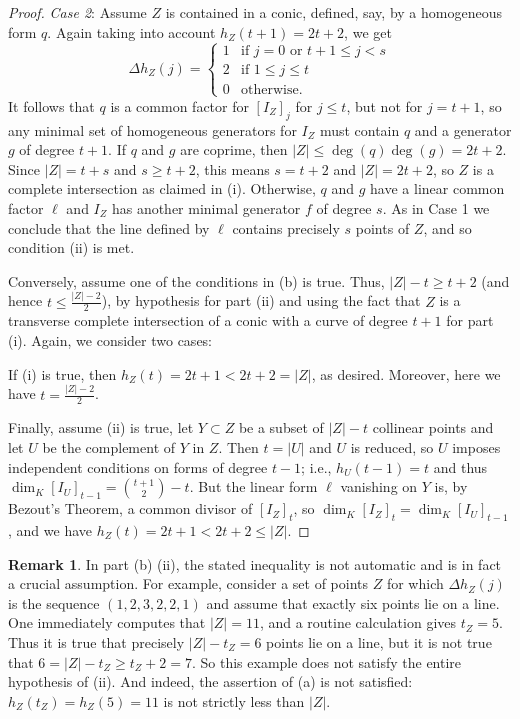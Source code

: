 \documentclass[12pt]{amsart}
\numberwithin{equation}{section}
\theoremstyle{definition}
\newtheorem{remark}[theorem]{Remark}
\begin{document}
\begin{proof}
\emph{Case 2}: Assume $Z$ is contained in a conic, defined, say, by a homogeneous form $q$. 
Again taking into account $h_Z (t + 1) = 2t + 2$, we get 
\begin{equation}
  \label{eq:h-vector}
\Delta h_Z (j) = 
\begin{cases}
1 & \text{if $j=0$ or $t+1 \le j < s$} \\
2 & \text{if } 1 \le j \le t \\
0 & \text{otherwise.}
\end{cases}
\end{equation}
It follows that $q$ is a common factor for $[I_Z]_j$ for $j\leq t$, but not for $j=t+1$,
so any minimal set of homogeneous generators for $I_Z$ must contain $q$ and a generator
$g$ of degree $t+1$. If $q$ and $g$ are coprime, then $|Z|\leq \deg(q)\deg(g)=2t+2$.
Since $|Z| = t+s$ and $s\geq t+2$, this means $s=t+2$ and $|Z|=2t+2$, so
$Z$ is a complete intersection as claimed in (i).
Otherwise, $q$ and $g$ have a linear common factor $\ell$ and $I_Z$ 
has another minimal generator $f$ of degree $s$. As in Case 1 we conclude that 
the line defined by $\ell$ contains precisely $s$ points of $Z$, and so condition (ii) is met. 
\smallskip

Conversely, assume one of the conditions in  (b) is true. Thus, $|Z| - t \ge t +2$
(and hence $t \le \frac{|Z| - 2}{2}$), by hypothesis for part (ii) and using the fact
that $Z$ is a transverse complete intersection of a conic with a curve of degree $t+1$
for part (i). Again, we consider two cases: 

If (i) is true, then  $h_Z (t)  = 2 t + 1 < 2 t + 2 = |Z|$, as desired. Moreover, here we have $t = \frac{|Z| - 2}{2}$.

Finally, assume (ii) is true, let $Y \subset Z$ be a subset of $|Z|-t$ collinear points
and let $U$ be the complement of $Y$ in $Z$. Then $t=|U|$ and $U$ is reduced, so
$U$ imposes independent conditions on forms of degree $t-1$; i.e.,
$h_U(t-1)=t$ and thus $\dim_K [I_U]_{t-1}=\binom{t+1}{2}-t$. But the linear form $\ell$ 
vanishing on $Y$ is, by Bezout's Theorem,
a common divisor of $[I_Z]_t$, so $\dim_K [I_Z]_t=\dim_K [I_U]_{t-1}$, and we have $h_Z(t)=2t+1<2t+2 \leq |Z|$. 
\end{proof} 

\begin{remark}\label{JuanRem} 
In part (b) (ii), the stated inequality is not automatic and is in fact a crucial assumption. 
For example, consider a set of points $Z$ for which $\Delta h_Z(j)$ is the sequence  
$(1,2,3,2,2,1)$ and assume that exactly six points lie on a line. One immediately computes that $|Z| = 11$, and a routine calculation  gives  $t_Z = 5$. Thus it is true that precisely $|Z| - t_Z = 6$ points lie on a line, but it is not true that $6 = |Z| - t_Z \geq t_Z + 2 = 7$. So this example does not satisfy the entire hypothesis of (ii).  
And indeed, the assertion of (a) is not satisfied: $h_Z(t_Z) = h_Z(5) = 11$ is not strictly less than $|Z|$. 
\end{remark}
\end{document}
